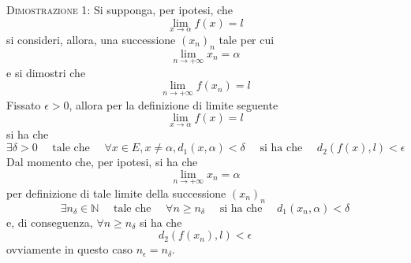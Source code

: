 \documentclass[a4paper]{extarticle}
\begin{document}
\vspace{2em}
\noindent
\normalfont \normalsize
\textsc{Dimostrazione 1}: Si supponga, per ipotesi, che
\[\lim_{x \to \alpha} f(x) = l\]
si consideri, allora, una successione $(x_n)_n$ tale per cui
\[\lim_{n \to +\infty} x_n = \alpha\]
e si dimostri che 
\[\lim_{n \to +\infty} f(x_n) = l\]
Fissato $\epsilon>0$, allora per la definizione di limite seguente
\[\lim_{x \to \alpha} f(x) = l\]
si ha che
\[\exists \delta > 0 \hspace{1em} \text{ tale che } \hspace{1em} \forall x \in E, x \neq \alpha, d_1(x,\alpha) < \delta \hspace{1em} \text{ si ha che } \hspace{1em} d_2(f(x),l) < \epsilon\]
Dal momento che, per ipotesi, si ha che
\[\lim_{n \to +\infty} x_n = \alpha\]
per definizione di tale limite della successione $(x_n)_n$
\[\exists n_\delta \in \mathbb{N} \hspace{1em} \text{ tale che } \hspace{1em} \forall n \geq n_\delta \hspace{1em} \text{ si ha che } \hspace{1em} d_1(x_n,\alpha) < \delta\]
e, di conseguenza, $\forall n \geq n_{\delta}$ si ha che
\[d_2(f(x_n),l) < \epsilon\]
ovviamente in questo caso $n_\epsilon = n_\delta$.
\end{document}
